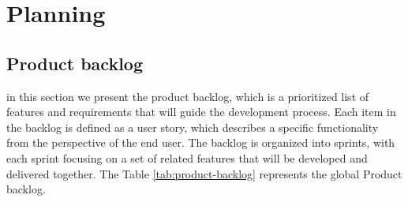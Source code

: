 \section{Planning}
\subsection{Product backlog}
in this section we present the product backlog, which is a prioritized list of features and requirements that will guide the development process. Each item in the backlog is defined as a user story, which describes a specific functionality from the perspective of the end user. The backlog is organized into sprints, with each sprint focusing on a set of related features that will be developed and delivered together. The Table \ref{tab:product-backlog} represents the global Product backlog.
\footnotesize
